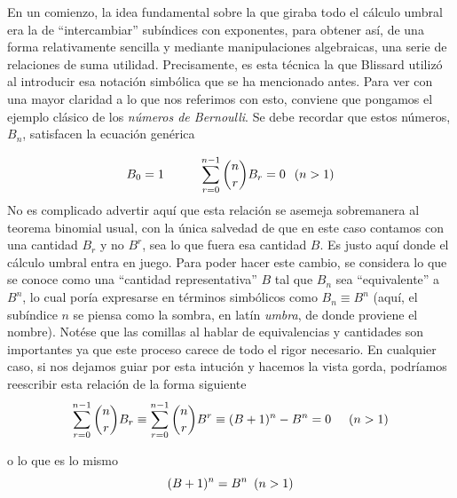 En un comienzo, la idea fundamental sobre la que giraba todo el cálculo umbral era la de ``intercambiar'' subíndices con exponentes, para obtener así, de una forma relativamente sencilla y mediante manipulaciones algebraicas, una serie de relaciones de suma utilidad. Precisamente, es esta técnica la que Blissard utilizó al introducir esa notación simbólica que se ha mencionado antes. Para ver con una mayor claridad a lo que nos referimos con esto, conviene que pongamos el ejemplo clásico de los \textit{números de Bernoulli}. Se debe recordar que estos números, $B_n$, satisfacen la ecuación genérica

\begin{equation*}
    B_0 = 1 \hspace{1cm} \sum_{r=0}^{n-1}\binom{n}{r}B_r = 0 \hspace{0.25cm} (n>1)
\end{equation*} 
No es complicado advertir aquí que esta relación se asemeja sobremanera al teorema binomial usual, con la única salvedad de que en este caso contamos con una cantidad $B_r$ y no $B^r$, sea lo que fuera esa cantidad $B$. Es justo aquí donde el cálculo umbral entra en juego. Para poder hacer este cambio, se considera lo que se conoce como una ``cantidad representativa'' $B$ tal que $B_n$ sea ``equivalente'' a $B^n$, lo cual poría expresarse en términos simbólicos como $B_n \equiv B^n$ (aquí, el subíndice $n$ se piensa como la sombra, en latín \textit{umbra}, de donde proviene el nombre). Notése que las comillas al hablar de equivalencias y cantidades son importantes ya que este proceso carece de todo el rigor necesario. En cualquier caso, si nos dejamos guiar por esta intución y hacemos la vista gorda, podríamos reescribir esta relación de la forma siguiente
\begin{equation*}
    \sum_{r=0}^{n-1}\binom{n}{r}B_r \equiv \sum_{r=0}^{n-1}\binom{n}{r}B^r\equiv (B+1)^n-B^n = 0 \hspace{0.5cm} (n>1)
\end{equation*}

o lo que es lo mismo
\begin{equation*}
    (B+1)^n = B^n \hspace{0.5em} (n>1)
\end{equation*}

